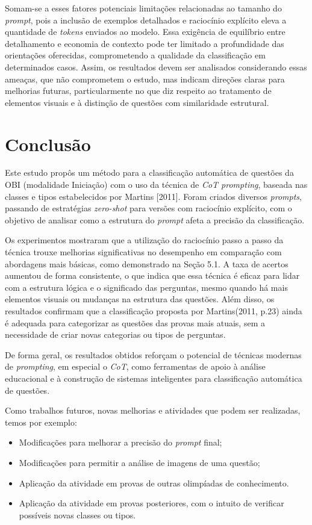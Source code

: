 \documentclass[12pt]{article}
\begin{document}
Somam-se a esses fatores potenciais limitações relacionadas ao tamanho do \textit{prompt}, pois a inclusão de exemplos detalhados e raciocínio explícito eleva a quantidade de \textit{tokens} enviados ao modelo. Essa exigência de equilíbrio entre detalhamento e economia de contexto pode ter limitado a profundidade das orientações oferecidas, comprometendo a qualidade da classificação em determinados casos. Assim, os resultados devem ser analisados considerando essas ameaças, que não comprometem o estudo, mas indicam direções claras para melhorias futuras, particularmente no que diz respeito ao tratamento de elementos visuais e à distinção de questões com similaridade estrutural.

\section{Conclusão}\label{sec:conclu}

Este estudo propôs um método para a classificação automática de questões da OBI (modalidade Iniciação) com o uso da técnica de \textit{CoT prompting}, baseada nas classes e tipos estabelecidos por Martins [2011]. Foram criados diversos \textit{prompts}, passando de estratégias \textit{zero-shot} para versões com raciocínio explícito, com o objetivo de analisar como a estrutura do \textit{prompt} afeta a precisão da classificação.

Os experimentos mostraram que a utilização do raciocínio passo a passo da técnica trouxe melhorias significativas no desempenho em comparação com abordagens mais básicas, como demonstrado na Seção 5.1. A taxa de acertos aumentou de forma consistente, o que indica que essa técnica é eficaz para lidar com a estrutura lógica e o significado das perguntas, mesmo quando há mais elementos visuais ou mudanças na estrutura das questões. Além disso, os resultados confirmam que a classificação proposta por Martins(2011, p.23) ainda é adequada para categorizar as questões das provas mais atuais, sem a necessidade de criar novas categorias ou tipos de perguntas.

De forma geral, os resultados obtidos reforçam o potencial de técnicas modernas de \textit{prompting}, em especial o \textit{CoT}, como ferramentas de apoio à análise educacional e à construção de sistemas inteligentes para classificação automática de questões.

    Como trabalhos futuros, novas melhorias e atividades que podem ser realizadas, temos por exemplo:

    \begin{itemize}
        \item Modificações para melhorar a precisão do \textit{prompt} final;
        \item Modificações para permitir a análise de imagens de uma questão;
        \item Aplicação da atividade em provas de outras olimpíadas de conhecimento.
        \item Aplicação da atividade em provas posteriores, com o intuito de verificar possíveis novas classes ou tipos.
    \end{itemize}



\end{document}

